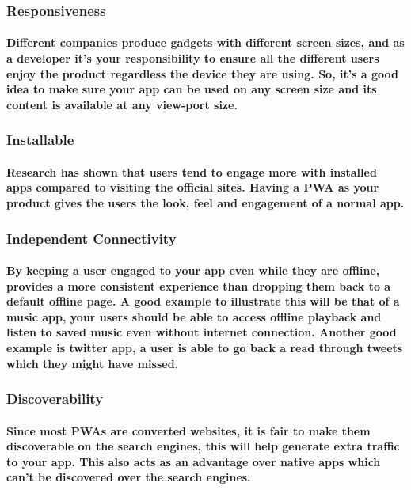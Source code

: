 \documentclass[12pt,a4paper]{article}
\begin{document}
    \subsubsection{Responsiveness}

    \paragraph{Different companies produce gadgets with different screen sizes, and as a developer it's your responsibility to ensure all the different users enjoy the product regardless the device they are using. So, it's a good idea to make sure your app can be used on any screen size and its content is available at any view-port size.}

    \subsubsection{Installable}

    \paragraph{Research has shown that users tend to engage more with installed apps compared to visiting the official sites. Having a PWA as your product gives the users the look, feel and engagement of a normal app.}

    \subsubsection{Independent Connectivity}

    \paragraph{By keeping a user engaged to your app even while they are offline, provides a more consistent experience than dropping them back to a default offline page. A good example to illustrate this will be that of a music app, your users should be able to access offline playback and listen to saved music even without internet connection. Another good example is twitter app, a user is able to go back a read through tweets which they might have missed.
}

    \subsubsection{Discoverability}

    \paragraph{Since most PWAs are converted websites, it is fair to make them discoverable on the search engines, this will help generate extra traffic to your app. This also acts as an advantage over native apps which can't be discovered over the search engines.
}
\end{document}
